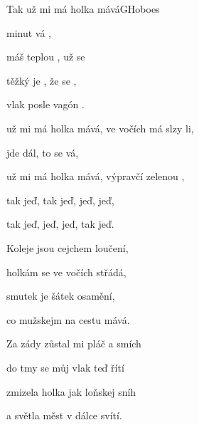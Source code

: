 \begin{song}{Tak už mi má holka mává}{G}{Hoboes}

\begin{SBVerse}

  minut vá ,

máš teplou , už se 

těžký je , že se  ,

vlak posle vagón .

\end{SBVerse}

\begin{SBChorus}

 už mi má holka mává, ve vočích má slzy li,

 jde dál, to se vá,  

 už mi má holka mává, výpravčí zelenou ,

tak  jeď, tak jeď, jeď, jeď,

tak jeď, jeď, jeď, tak jeď.

\end{SBChorus}

\begin{SBVerse}

Koleje jsou cejchem loučení,

holkám se ve vočích střádá,

smutek je šátek osamění,

co mužskejm na cestu mává.

\end{SBVerse}

\begin{SBChorus}

\end{SBChorus}

\begin{SBVerse}

Za zády zůstal mi pláč a smích

do tmy se můj vlak teď řítí

zmizela holka jak loňskej sníh

a světla měst v dálce svítí.

\end{SBVerse}

\begin{SBChorus}

\end{SBChorus}

\end{song}

\clearpage
